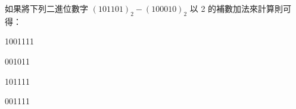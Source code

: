 \ifx\ntpcNinetyThree\undefined[93學年基北區] \fi
如果將下列二進位數字 ${(101101)}_{2}-{(100010)}_{2}$ 以 2 的補數加法來計算則可得：
  \begin{optionlist}
  \item 1001111
  \item 001011\label{ntpc-93-a10}
  \item 101111
  \item 001111
  \end{optionlist}